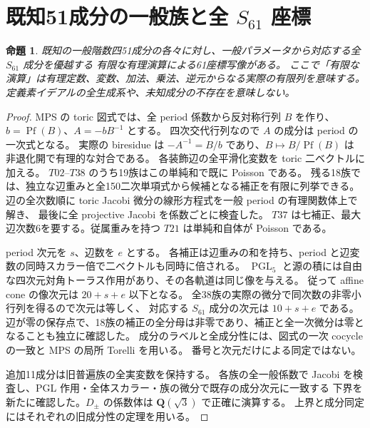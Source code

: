 \documentclass[11pt,a4paper]{ltjsarticle}
\newcommand{\QQ}{\mathbf Q}
\DeclareMathOperator{\PGL}{PGL}
\newtheorem{proposition}[theorem]{命題}
\theoremstyle{remark}
\begin{document}
\section{既知51成分の一般族と全 $S_{61}$ 座標}\label{sec:known51-catalogue}

\begin{proposition}\label{prop:known51-circuits}
既知の一般階数四51成分の各々に対し、一般パラメータから対応する全 $S_{61}$ 成分を優越する
有限な有理演算による61座標写像がある。
ここで「有限な演算」は有理定数、変数、加法、乗法、逆元からなる実際の有限列を意味する。
定義素イデアルの全生成系や、未知成分の不存在を意味しない。
\end{proposition}
\begin{proof}
MPS の toric 図式では、全 period 係数から反対称行列 $B$ を作り、
$b=\operatorname{Pf}(B)$、$A=-bB^{-1}$ とする。
四次交代行列なので $A$ の成分は period の一次式となる。
実際の biresidue は $-A^{-1}=B/b$ であり、$B\mapsto B/\operatorname{Pf}(B)$ は
非退化開で有理的な対合である。
各装飾辺の全平滑化変数を toric 二ベクトルに加える。
$T02$--$T38$ のうち19族はこの単純和で既に Poisson である。
残る18族では、独立な辺重みと全150二次単項式から候補となる補正を有限に列挙できる。
辺の全次数順に toric Jacobi 微分の線形方程式を一般 period の有理関数体上で解き、
最後に全 projective Jacobi を係数ごとに検査した。
$T37$ は七補正、最大辺次数6を要する。従属重みを持つ $T21$ は単純和自体が Poisson である。

period 次元を $s$、辺数を $e$ とする。
各補正は辺重みの和を持ち、period と辺変数の同時スカラー倍で二ベクトルも同時に倍される。
$\PGL_5$ と源の積には自由な四次元対角トーラス作用があり、その各軌道は同じ像を与える。
従って affine cone の像次元は $20+s+e$ 以下となる。
全38族の実際の微分で同次数の非零小行列を得るので次元は等しく、
対応する $S_{61}$ 成分の次元は $10+s+e$ である。
辺が零の保存点で、18族の補正の全分母は非零であり、補正と全一次微分は零となることも独立に確認した。
成分のラベルと全成分性には、図式の一次 cocycle の一致と MPS の局所 Torelli
\cite[Theorem 6.16, Corollary 6.23, Example 6.24]{mps}を用いる。
番号と次元だけによる同定ではない\cite{mps-general-v62,known51-review-v62}。

追加11成分は旧普遍族の全実変数を保持する。
各族の全一般係数で Jacobi を検査し、PGL 作用・全体スカラー・族の微分で既存の成分次元に一致する
下界を新たに確認した。$D_\pm$ の係数体は $\QQ(\sqrt3)$ で正確に演算する。
上界と成分同定にはそれぞれの旧成分性の定理を用いる。


\end{proof}
\end{document}
